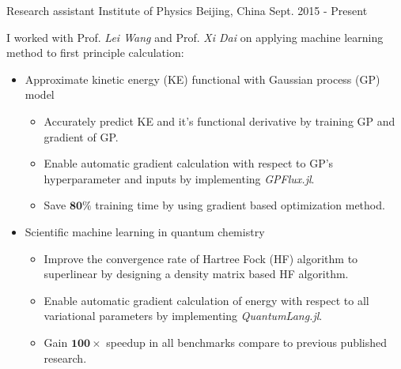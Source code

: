 
\begin{cventries}
    \cventry
    {Research assistant}
    {Institute of Physics}
    {Beijing, China}
    {Sept. 2015 - Present}
    {
        I worked with Prof. \textit{Lei Wang} and Prof. \textit{Xi Dai} on applying machine learning method to first principle calculation:
        \begin{itemize}
            \item Approximate kinetic energy (KE) functional with Gaussian process (GP) model
                \begin{itemize}
                    \item Accurately predict KE and it's functional derivative by training GP and gradient of GP.
                    \item Enable automatic gradient calculation with respect to GP's hyperparameter and inputs by implementing \textit{GPFlux.jl}. 
                    \item Save $\mathbf{80}\%$ training time by using gradient based optimization method. 
                \end{itemize}
            \item Scientific machine learning in quantum chemistry
                \begin{itemize}
                    \item Improve the convergence rate of Hartree Fock (HF) algorithm to superlinear by designing a density matrix based HF algorithm.
                    \item Enable automatic gradient calculation of energy with respect to all variational parameters by implementing \textit{QuantumLang.jl}.
                    \item Gain $\mathbf{100\times}$ speedup in all benchmarks compare to previous published research.
                \end{itemize}
        \end{itemize}
    }
\end{cventries}



